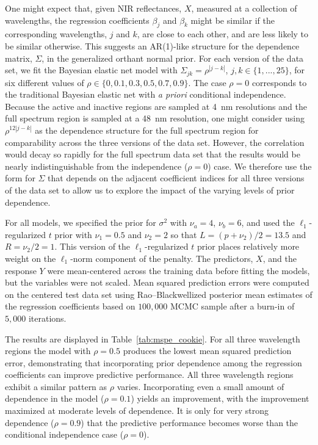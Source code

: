 \documentclass[12pt]{article}
\begin{document}
One might expect that, given NIR reflectances, $X$, measured at a collection
of wavelengths, the regression coefficients $\beta_j$ and $\beta_k$ might be similar
if the corresponding wavelengths, $j$ and $k$, are close to each other, and are less
likely to be similar otherwise. This suggests an AR(1)-like structure for the
dependence matrix, $\Sigma$, in the generalized orthant normal prior. For each
version of the data set, we fit the Bayesian elastic net model with
$\Sigma_{jk} = \rho^{|j-k|}$, $j, k \in \{1, ..., 25\}$, for six different values of 
$\rho \in \{0, 0.1, 0.3, 0.5, 0.7, 0.9\}$. The case $\rho = 0$ corresponds to the 
traditional Bayesian elastic net with \emph{a priori} conditional independence. Because
the active and inactive regions are sampled at 4~nm resolutions and the full spectrum 
region is sampled at a 48~nm resolution, one might consider using $\rho^{12|j-k|}$ 
as the dependence structure for the full spectrum region for comparability across
the three versions of the data set. However, the correlation would decay so rapidly
for the full spectrum data set that the results would be nearly indistinguishable 
from the independence ($\rho=0$) case. We therefore use the form for $\Sigma$ that
depends on the adjacent coefficient indices for all three versions of the data set
to allow us to explore the impact of the varying levels of prior dependence.

For all models, we specified the prior for $\sigma^2$ with $\nu_a = 4$, $\nu_b = 6$,
and used the $\ell_1$-regularized $t$ prior with $\nu_1 = 0.5$ and $\nu_2 = 2$ so
that $L = (p + \nu_2)/2 = 13.5$ and $R = \nu_2/2 = 1$. This version of the 
$\ell_1$-regularized $t$ prior places relatively more weight on the $\ell_1$-norm 
component of the penalty. The predictors, $X$, and the response $Y$ were 
mean-centered across the training data before fitting the models, but the variables 
were not scaled. Mean squared prediction errors were computed on the centered
test data set using Rao--Blackwellized posterior mean estimates of the regression 
coefficients based on $100,000$ MCMC sample after a burn-in of $5,000$ iterations.

The results are displayed in Table~\ref{tab:mspe_cookie}. For all three wavelength
regions the model with $\rho = 0.5$ produces the lowest mean squared prediction
error, demonstrating that incorporating prior dependence among the regression 
coefficients can improve predictive performance. All three wavelength regions exhibit
a similar pattern as $\rho$ varies. Incorporating even a small amount of dependence in
the model ($\rho = 0.1$) yields an improvement, with the improvement maximized at
moderate levels of dependence. It is only for very strong dependence
($\rho = 0.9$) that the predictive performance becomes worse than the conditional
independence case ($\rho = 0$). 
\end{document}
